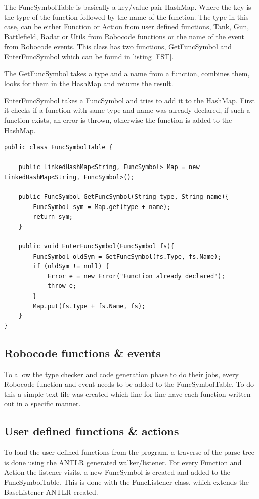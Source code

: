 The FuncSymbolTable is basically a key/value pair HashMap. Where the key is the type of the function followed by the name of the function. The type in this case, can be either Function or Action from user defined functions, Tank, Gun, Battlefield, Radar or Utils from Robocode functions or the name of the event from Robocode events.
This class has two functions, GetFuncSymbol and EnterFuncSymbol which can be found in listing \ref{FST}. 

The GetFuncSymbol takes a type and a name from a function, combines them, looks for them in the HashMap and returns the result.

EnterFuncSymbol takes a FuncSymbol and tries to add it to the HashMap. First it checks if a function with same type and name was already declared, if such a function exists, an error is thrown, otherwise the function is added to the HashMap.

\begin{lstlisting}[caption={FuncSymbolTable}, label={FST}]
public class FuncSymbolTable {

	public LinkedHashMap<String, FuncSymbol> Map = new LinkedHashMap<String, FuncSymbol>();

	public FuncSymbol GetFuncSymbol(String type, String name){
    	FuncSymbol sym = Map.get(type + name);
    	return sym;
	}

	public void EnterFuncSymbol(FuncSymbol fs){
    	FuncSymbol oldSym = GetFuncSymbol(fs.Type, fs.Name);
    	if (oldSym != null) {
        	Error e = new Error("Function already declared");
        	throw e;
    	}
    	Map.put(fs.Type + fs.Name, fs);
	}
}
\end{lstlisting}
\subsection{Robocode functions \& events}
To allow the type checker and code generation phase to do their jobs, every Robocode function and event needs to be added to the FuncSymbolTable. To do this a simple text file was created which line for line have each function written out in a specific manner. 

\subsection{User defined functions \& actions}
To load the user defined functions from the program, a traverse of the parse tree is done using the ANTLR generated walker/listener. For every Function and Action the listener visits, a new FuncSymbol is created and added to the FuncSymbolTable. This is done with the FuncListener class, which extends the BaseListener ANTLR created.
 
